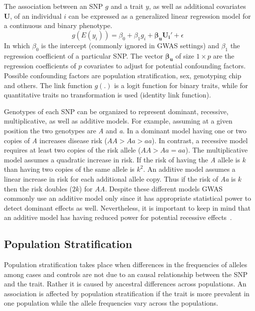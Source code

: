 The association between an SNP $g$ and a trait $y$, as well as additional covariates $\bm{U}$, of an individual $i$ can be expressed as a generalized linear regression model for a continuous and binary phenotype.
\begin{equation}
  g(E(y_i)) = \beta_0 + \beta_1g_i + \bm{\beta_u}\bm{U_i'} + \epsilon
\end{equation}
In which $\beta_0$ is the intercept (commonly ignored in GWAS settings) and $\beta_1$ the regression coefficient of a particular SNP\@.
The vector $\bm{\beta_u}$ of size $1\times p$ are the regression coefficients of $p$ covariates to adjust for potential confounding factors.
Possible confounding factors are population stratification, sex, genotyping chip and others.
The link function $g(.)$ is a logit function for binary traits, while for quantitative traits no transformation is used (identity link function). 

Genotypes of each SNP can be organized to represent dominant, recessive, multiplicative, as well as additive models.
For example, assuming at a given position the two genotypes are \textit{A} and \textit{a}.
In a dominant model having one or two copies of \textit{A} increases disease risk ($AA > Aa > aa$).
In contrast, a recessive model requires at least two copies of the risk allele ($AA > Aa = aa$).
The multiplicative model assumes a quadratic increase in risk.
If the risk of having the \textit{A} allele is $k$ than having two copies of the same allele is $k^2$.
An additive model assumes a linear increase in risk for each additional allele copy.
Thus if the risk of \textit{Aa} is $k$ then the risk doubles ($2k$) for \textit{AA}. 
Despite these different models GWAS commonly use an additive model only since it has appropriate statistical power to detect dominant effects as well.
Nevertheless, it is important to keep in mind that an additive model has  having reduced power for potential recessive effects~\cite{Bush2012}.

\subsection{Population Stratification}
\label{ssec:population_stratification}

Population stratification takes place when differences in the frequencies of alleles among cases and controls are not due to an causal relationship between the SNP and the trait.
Rather it is caused by ancestral differences across populations.
An association is affected by population stratification if the trait is more prevalent in one population while the allele frequencies vary across the populations.

